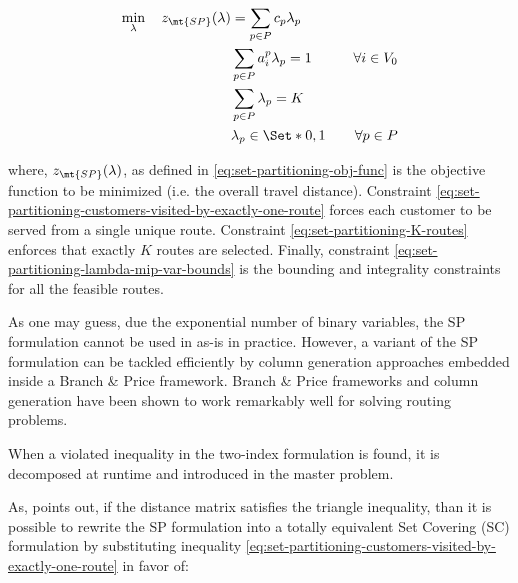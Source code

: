 \begin{align}
	\min_{\lambda} \quad z_\mt{SP}(\lambda) & = \sum_{p \in P}  c_p \lambda_p \label{eq:set-partitioning-obj-func}                                                                                                                                           \\
	                                        & \sum_{p \in P}  a_{i}^p \lambda_p = 1                                & \quad \forall i \in V_0                                              \label{eq:set-partitioning-customers-visited-by-exactly-one-route} \\
	                                        & \sum_{p \in P} \lambda_{p} = K\label{eq:set-partitioning-K-routes}                                                                                                                                             \\
	                                        & \lambda_p                    \in \Set*{0, 1}                         & \quad \forall p \in P \label{eq:set-partitioning-lambda-mip-var-bounds}
\end{align}

where, $z_\mt{SP}(\lambda)$, as defined in \eqref{eq:set-partitioning-obj-func} is the objective function to be minimized (i.e. the overall travel distance).
Constraint \eqref{eq:set-partitioning-customers-visited-by-exactly-one-route} forces each customer to be served from a single unique route.
Constraint \eqref{eq:set-partitioning-K-routes} enforces that exactly $K$ routes are selected.
Finally, constraint \eqref{eq:set-partitioning-lambda-mip-var-bounds} is the bounding and integrality constraints for all the feasible routes.

As one may guess, due the exponential number of binary variables, the SP formulation cannot be used in as-is in practice.
However, a variant of the SP formulation can be tackled efficiently by column generation approaches embedded inside a Branch \& Price framework.
Branch \& Price frameworks and column generation have been shown to work remarkably well for solving routing problems.

When a violated inequality in the two-index formulation is found, it is decomposed at runtime and introduced in the master problem.

As, \textcite{toth2002} points out, if the distance matrix satisfies the triangle inequality,
than it is possible to rewrite the SP formulation into a totally equivalent Set Covering (SC) formulation
by substituting inequality \eqref{eq:set-partitioning-customers-visited-by-exactly-one-route} in favor of:

